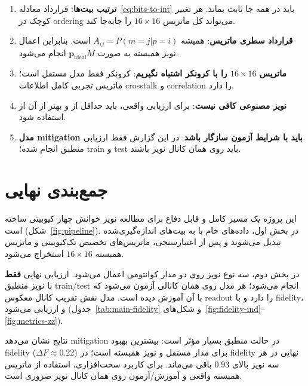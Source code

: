 \begin{enumerate}
	\item \textbf{ترتیب بیت‌ها}: قرارداد معادله~\eqref{eq:bits-to-int} باید در همه جا ثابت بماند. هر تغییر کوچک در ordering می‌تواند کل ماتریس $16\times16$ را جابه‌جا کند.
	\item \textbf{قرارداد سطری ماتریس}: همیشه $A_{ij}=P(m=j|p=i)$ است. بنابراین اعمال نویز همبسته به صورت $\mathbf{p}_{\mathrm{ideal}}M$ انجام می‌شود.
	\item \textbf{ماتریس $16\times16$ را با کرونکر اشتباه نگیریم}: کرونکر فقط مدل مستقل است؛ ماتریس تجربی کامل اطلاعات crosstalk و correlation را دارد.
	\item \textbf{نویز مصنوعی کافی نیست}: برای ارزیابی واقعی، باید حداقل از  و بهتر از آن از  استفاده شود.
	\item \textbf{مدل mitigation باید با شرایط آزمون سازگار باشد}: در این گزارش فقط ارزیابی منطبق انجام شده؛ train و test باید روی همان کانال نویز باشند.
\end{enumerate}

\section{جمع‌بندی نهایی}

این پروژه یک مسیر کامل و قابل دفاع برای مطالعه نویز خوانش چهار کیوبیتی ساخته است (شکل~\ref{fig:pipeline}). در بخش اول، داده‌های خام  با  به بیت‌های اندازه‌گیری‌شده تبدیل می‌شوند و پس از اعتبارسنجی، ماتریس‌های تخصیص تک‌کیوبیتی و ماتریس همبسته $16\times16$ استخراج می‌شود.

در بخش دوم، سه نوع نویز روی دو مدار کوانتومی اعمال می‌شود. ارزیابی نهایی \textbf{فقط} با نویز منطبق train/test انجام می‌شود؛ هر مدل روی همان کانالی آزمون می‌شود که با آن آموزش دیده است. مدل  نقش تقریب کانال معکوس readout را دارد و با fidelity،  و  ارزیابی می‌شود (جدول~\ref{tab:main-fidelity} و شکل‌های~\ref{fig:fidelity-ind}--\ref{fig:metrics-zz}).

نتایج نشان می‌دهد mitigation در حالت منطبق بسیار مؤثر است: بیشترین بهبود fidelity ($\Delta F \approx 0.22$) برای مدار مستقل و نویز همبسته است؛ در  fidelity نهایی در هر سه نویز بالای $0.93$ باقی می‌ماند. برای کاربرد سخت‌افزاری، استفاده از ماتریس همبسته واقعی و آموزش/آزمون روی همان کانال نویز ضروری است.
